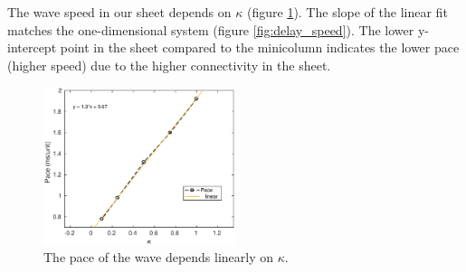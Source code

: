 The wave speed in our sheet depends on $\kappa$ (figure \ref{fig:2DWavePaceKappa}).
The slope of the linear fit matches the one-dimensional system (figure \ref{fig:delay_speed}). 
The lower y-intercept point in the sheet compared to the minicolumn indicates the lower pace (higher speed) due to the higher connectivity in the sheet.
\begin{figure}[!htb]
 \caption{ The pace of the wave depends linearly on $\kappa$.
           }
 \label{fig:2DWavePaceKappa}
 \centering
   \includegraphics[width=0.5\textwidth]{fig/2DWavePace_Kappa}
\end{figure}
\FloatBarrier


